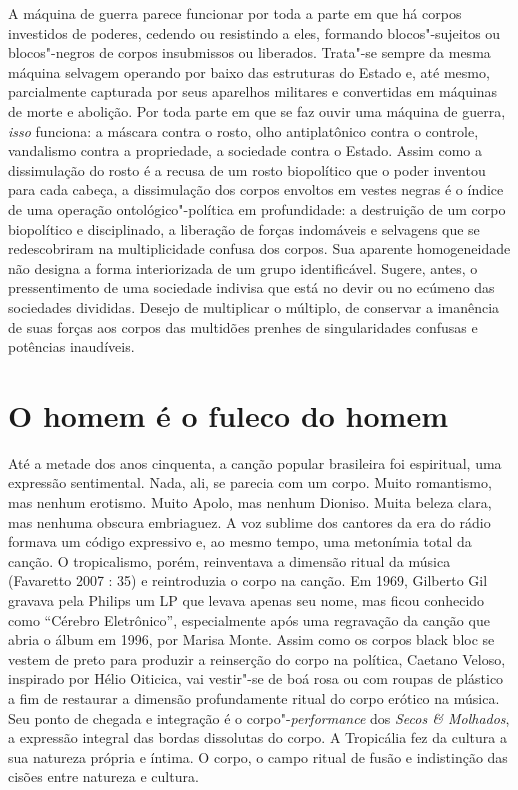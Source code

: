A máquina de guerra parece funcionar por toda a parte em que há corpos
investidos de poderes, cedendo ou resistindo a eles, formando
blocos"-sujeitos ou blocos"-negros de corpos insubmissos ou liberados.
Trata"-se sempre da mesma máquina selvagem operando por baixo das
estruturas do Estado e, até mesmo, parcialmente capturada por seus
aparelhos militares e convertidas em máquinas de morte e abolição. Por
toda parte em que se faz ouvir uma máquina de guerra, \emph{isso
}funciona: a máscara contra o rosto, olho antiplatônico contra o
controle, vandalismo contra a propriedade, a sociedade contra o Estado.
Assim como a dissimulação do rosto é a recusa de um rosto biopolítico
que o poder inventou para cada cabeça, a dissimulação dos corpos
envoltos em vestes negras é o índice de uma operação ontológico"-política
em profundidade: a destruição de um corpo biopolítico e disciplinado, a
liberação de forças indomáveis e selvagens que se redescobriram na
multiplicidade confusa dos corpos. Sua aparente homogeneidade não
designa a forma interiorizada de um grupo identificável. Sugere, antes,
o pressentimento de uma sociedade indivisa que está no devir ou no
ecúmeno das sociedades divididas. Desejo de multiplicar o múltiplo, de
conservar a imanência de suas forças aos corpos das multidões prenhes de
singularidades confusas e potências inaudíveis.


\section{O homem é o fuleco do homem}

Até a metade dos anos cinquenta, a canção popular brasileira foi
espiritual, uma expressão sentimental. Nada, ali, se parecia com um
corpo. Muito romantismo, mas nenhum erotismo. Muito Apolo, mas nenhum
Dioniso. Muita beleza clara, mas nenhuma obscura embriaguez. A voz
sublime dos cantores da era do rádio formava um código expressivo e, ao
mesmo tempo, uma metonímia total da canção. O tropicalismo, porém,
reinventava a dimensão ritual da música (Favaretto 2007 : 35) e
reintroduzia o corpo na canção. Em 1969, Gilberto Gil gravava pela
Philips um LP que levava apenas seu nome, mas ficou conhecido como
``Cérebro Eletrônico'', especialmente após uma regravação da canção que
abria o álbum em 1996, por Marisa Monte. Assim como os corpos black bloc
se vestem de preto para produzir a reinserção do corpo na política,
Caetano Veloso, inspirado por Hélio Oiticica, vai vestir"-se de boá rosa
ou com roupas de plástico a fim de restaurar a dimensão profundamente
ritual do corpo erótico na música. Seu ponto de chegada e integração é o
corpo"-\emph{performance} dos \emph{Secos \& Molhados}, a expressão
integral das bordas dissolutas do corpo. A Tropicália fez da cultura a
sua natureza própria e íntima. O corpo, o campo ritual de fusão e
indistinção das cisões entre natureza e cultura.

